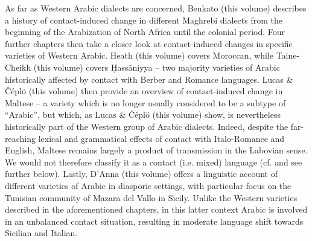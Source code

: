 \documentclass[output=paper]{langsci/langscibook}
\begin{document}
As far as Western Arabic dialects are concerned, Benkato (this volume) describes a history of contact-induced change in different Maghrebi dialects from the beginning of the Arabization of North Africa until the colonial period. Four further chapters then take a closer look at contact-induced changes in specific varieties of Western Arabic. Heath (this volume) covers Moroccan, while Taine-Cheikh (this volume) covers Ḥassāniyya -- two majority varieties of Arabic historically affected by contact with Berber and Romance languages. Lucas \& Čéplö (this volume) then provide an overview of contact-induced change in Maltese -- a variety which is no longer usually considered to be a subtype of ``Arabic'', but which, as Lucas \& Čéplö (this volume) show, is nevertheless historically part of the Western group of Arabic dialects. Indeed, despite the far-reaching lexical and grammatical effects of contact with Italo-Romance and English, Maltese remains largely a product of transmission in the Labovian sense. We would not therefore classify it as a contact (i.e. mixed) language (cf. \citealt{stolz2003} and see further below). Lastly, D’Anna (this volume) offers a linguistic account of different varieties of Arabic in diasporic settings, with particular focus on the Tunisian community of Mazara del Vallo in Sicily. Unlike the Western varieties described in the aforementioned chapters, in this latter context Arabic is involved in an unbalanced contact situation, resulting in moderate language shift towards Sicilian and Italian.
\end{document}

